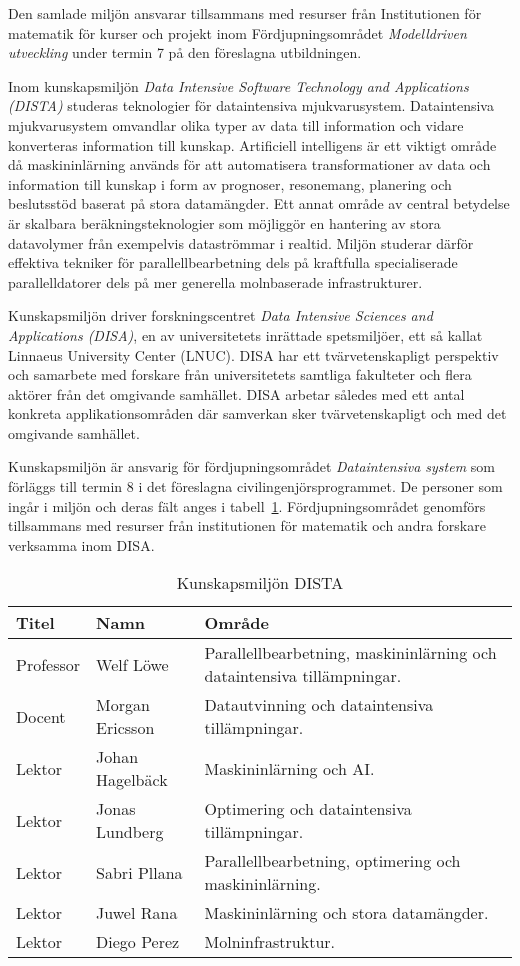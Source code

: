 Den samlade miljön ansvarar tillsammans med resurser från Institutionen för matematik för kurser och projekt inom Fördjupningsområdet \emph{Modelldriven utveckling} under termin 7 på den föreslagna utbildningen.

Inom kunskapsmiljön \emph{Data Intensive Software Technology and Applications (DISTA)} studeras teknologier för dataintensiva mjukvarusystem. Dataintensiva mjukvarusystem omvandlar olika typer av data till information och vidare konverteras information till kunskap. Artificiell intelligens är ett viktigt område då maskininlärning används för att automatisera transformationer av data och information till kunskap i form av prognoser, resonemang, planering och beslutsstöd baserat på stora datamängder. Ett annat område av central betydelse är skalbara beräkningsteknologier som möjliggör en hantering av stora datavolymer från exempelvis dataströmmar i realtid. Miljön studerar därför effektiva tekniker för parallellbearbetning dels på kraftfulla specialiserade parallelldatorer dels på mer generella molnbaserade infrastrukturer.

Kunskapsmiljön driver forskningscentret \emph{Data Intensive Sciences and Applications (DISA)}, en av universitetets inrättade spetsmiljöer, ett så kallat Linnaeus University Center (LNUC). DISA har ett tvärvetenskapligt perspektiv och samarbete med forskare från universitetets samtliga fakulteter och flera aktörer från det omgivande samhället. DISA arbetar således med ett antal konkreta applikationsområden där samverkan sker tvärvetenskapligt och med det omgivande samhället.

Kunskapsmiljön är ansvarig för fördjupningsområdet \emph{Dataintensiva system} som förläggs till termin 8 i det föreslagna civilingenjörsprogrammet. De personer som ingår i miljön och deras fält anges i tabell~\ref{tab:kmdista}. Fördjupningsområdet genomförs tillsammans med resurser från institutionen för matematik och andra forskare verksamma inom DISA.

\begin{table}
\centering
\caption{Kunskapsmiljön DISTA\label{tab:kmdista}}
\begin{tabular}{@{}llp{8cm}@{}}
\toprule
\textbf{\textsf{Titel}} & \textbf{\textsf{Namn}} & \textbf{\textsf{Område}}\tabularnewline
\midrule
Professor & Welf Löwe & Parallellbearbetning, maskininlärning och dataintensiva
tillämpningar.\tabularnewline
Docent & Morgan Ericsson & Datautvinning och dataintensiva tillämpningar.\tabularnewline
Lektor & Johan Hagelbäck & Maskininlärning och AI. \tabularnewline
Lektor & Jonas Lundberg & Optimering och dataintensiva
tillämpningar.\tabularnewline
Lektor & Sabri Pllana & Parallellbearbetning, optimering och maskininlärning.\tabularnewline
Lektor & Juwel Rana & Maskininlärning och stora datamängder.\tabularnewline
Lektor & Diego Perez & Molninfrastruktur.\tabularnewline
\bottomrule
\end{tabular}
\end{table}

